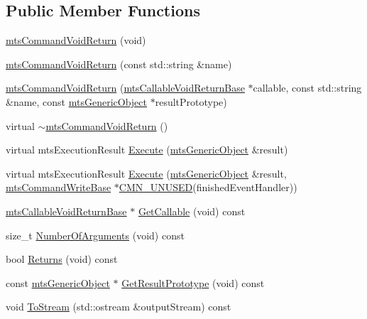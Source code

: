 \subsection*{Public Member Functions}
\begin{DoxyCompactItemize}
\item 
\hyperlink{classmts_command_void_return_a84b2df87b12e71023af81973c97ec4d5}{mts\+Command\+Void\+Return} (void)
\item 
\hyperlink{classmts_command_void_return_ac08a4ddcbf2a8ebbb6ea2656984c8f88}{mts\+Command\+Void\+Return} (const std\+::string \&name)
\item 
\hyperlink{classmts_command_void_return_ad8e8d4618f68defac066f5829e4fcd16}{mts\+Command\+Void\+Return} (\hyperlink{classmts_callable_void_return_base}{mts\+Callable\+Void\+Return\+Base} $\ast$callable, const std\+::string \&name, const \hyperlink{classmts_generic_object}{mts\+Generic\+Object} $\ast$result\+Prototype)
\item 
virtual \hyperlink{classmts_command_void_return_a2afc12e3d5e96bc31d4f523ea44e9bdf}{$\sim$mts\+Command\+Void\+Return} ()
\item 
virtual mts\+Execution\+Result \hyperlink{classmts_command_void_return_aae2d39f21bdefca19ee6bb4abc664ce1}{Execute} (\hyperlink{classmts_generic_object}{mts\+Generic\+Object} \&result)
\item 
virtual mts\+Execution\+Result \hyperlink{classmts_command_void_return_a286ec3b77f73dda7aa9a90a05ac77f7b}{Execute} (\hyperlink{classmts_generic_object}{mts\+Generic\+Object} \&result, \hyperlink{classmts_command_write_base}{mts\+Command\+Write\+Base} $\ast$\hyperlink{cmn_portability_8h_a021894e2626935fa2305434b1e893ff6}{C\+M\+N\+\_\+\+U\+N\+U\+S\+E\+D}(finished\+Event\+Handler))
\item 
\hyperlink{classmts_callable_void_return_base}{mts\+Callable\+Void\+Return\+Base} $\ast$ \hyperlink{classmts_command_void_return_ae51b5a892029231c81c830c228a2c76f}{Get\+Callable} (void) const 
\item 
size\+\_\+t \hyperlink{classmts_command_void_return_a69273f6aae517e8ddfbc72d35ad52770}{Number\+Of\+Arguments} (void) const 
\item 
bool \hyperlink{classmts_command_void_return_a6f0b136981f08438c113f79c22307723}{Returns} (void) const 
\item 
const \hyperlink{classmts_generic_object}{mts\+Generic\+Object} $\ast$ \hyperlink{classmts_command_void_return_a4374cba092b2ea18525906483c03086f}{Get\+Result\+Prototype} (void) const 
\item 
void \hyperlink{classmts_command_void_return_a38818dd8c12d96d4dd9c21dcfdbb905d}{To\+Stream} (std\+::ostream \&output\+Stream) const 
\end{DoxyCompactItemize}

